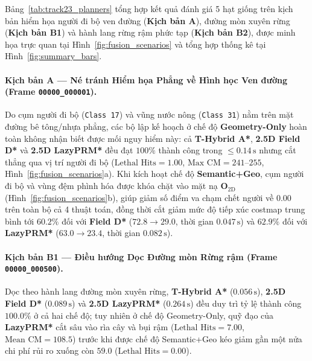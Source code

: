 \documentclass[a4paper,fleqn]{cas-sc}
\begin{document}
Bảng~\ref{tab:track23_planners} tổng hợp kết quả đánh giá 5 hạt giống trên kịch bản hiểm họa người đi bộ ven đường (\textbf{Kịch bản A}), đường mòn xuyên rừng (\textbf{Kịch bản B1}) và hành lang rừng rậm phức tạp (\textbf{Kịch bản B2}), được minh họa trực quan tại Hình~\ref{fig:fusion_scenarios} và tổng hợp thống kê tại Hình~\ref{fig:summary_bars}.

\paragraph{Kịch bản A — Né tránh Hiểm họa Phẳng về Hình học Ven đường (Frame \texttt{00000\_000001}).}
Do cụm người đi bộ (\texttt{Class 17}) và vũng nước nông (\texttt{Class 31}) nằm trên mặt đường bê tông/nhựa phẳng, các bộ lập kế hoạch ở chế độ \textbf{Geometry-Only} hoàn toàn không nhận biết được mối nguy hiểm này: cả \textbf{T-Hybrid A*}, \textbf{2.5D Field D*} và \textbf{2.5D LazyPRM*} đều đạt $100\%$ thành công trong $\le 0.14\,\text{s}$ nhưng cắt thẳng qua vị trí người đi bộ ($\text{Lethal Hits} = 1.00$, $\text{Max CM} = 241\text{--}255$, Hình~\ref{fig:fusion_scenarios}a). Khi kích hoạt chế độ \textbf{Semantic+Geo}, cụm người đi bộ và vùng đệm phình hóa được khóa chặt vào mặt nạ $\mathbf{O}_{2\text{D}}$ (Hình~\ref{fig:fusion_scenarios}b), giúp giảm số điểm va chạm chết người về \textbf{$0.00$} trên toàn bộ cả 4 thuật toán, đồng thời cắt giảm mức độ tiếp xúc costmap trung bình tới \textbf{$60.2\%$} đối với \textbf{Field D*} ($72.8 \to 29.0$, thời gian $0.047\,\text{s}$) và \textbf{$62.9\%$} đối với \textbf{LazyPRM*} ($63.0 \to 23.4$, thời gian $0.082\,\text{s}$).

\paragraph{Kịch bản B1 — Điều hướng Dọc Đường mòn Rừng rậm (Frame \texttt{00000\_000500}).}
Dọc theo hành lang đường mòn xuyên rừng, \textbf{T-Hybrid A*} ($0.056\,\text{s}$), \textbf{2.5D Field D*} ($0.089\,\text{s}$) và \textbf{2.5D LazyPRM*} ($0.264\,\text{s}$) đều duy trì tỷ lệ thành công $100.0\%$ ở cả hai chế độ; tuy nhiên ở chế độ Geometry-Only, quỹ đạo của \textbf{LazyPRM*} cắt sâu vào rìa cây và bụi rậm ($\text{Lethal Hits} = 7.00$, $\text{Mean CM} = 108.5$) trước khi được chế độ Semantic+Geo kéo giảm gần một nửa chi phí rủi ro xuống còn $59.0$ ($\text{Lethal Hits} = 0.00$).
\end{document}
